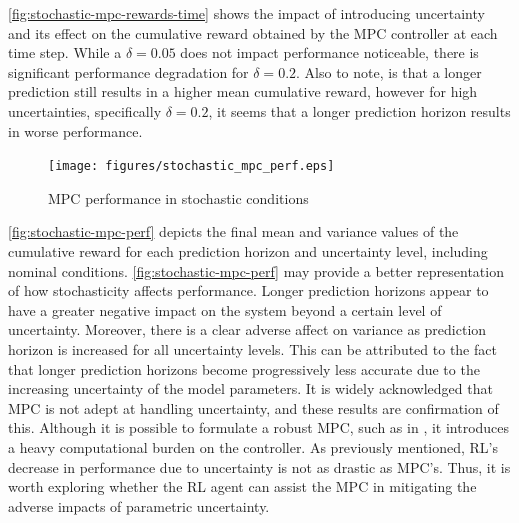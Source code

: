\autoref{fig:stochastic-mpc-rewards-time} shows the impact of introducing uncertainty and its effect on the cumulative reward obtained by the MPC controller at each time step. While a $\delta = 0.05$ does not impact performance noticeable, there is significant performance degradation for $\delta = 0.2$. Also to note, is that a longer prediction still results in a higher mean cumulative reward, however for high uncertainties, specifically $\delta = 0.2$, it seems that a longer prediction horizon results in worse performance.

\begin{figure}[H]
	\centering
	\texttt{[image: figures/stochastic\_mpc\_perf.eps]}
	\caption{MPC performance in stochastic conditions }
	\label{fig:stochastic-mpc-perf}
\end{figure}

\autoref{fig:stochastic-mpc-perf} depicts the final mean and variance values of the cumulative reward for each prediction horizon and uncertainty level, including nominal conditions. \autoref{fig:stochastic-mpc-perf} may provide a better representation of how stochasticity affects performance. Longer prediction horizons appear to have a greater negative impact on the system beyond a certain level of uncertainty. Moreover, there is a clear adverse affect on variance as prediction horizon is increased for all uncertainty levels. This can be attributed to the fact that longer prediction horizons become progressively less accurate due to the increasing uncertainty of the model parameters. It is widely acknowledged that MPC is not adept at handling uncertainty, and these results are confirmation of this. Although it is possible to formulate a robust MPC, such as in \cite{boersmaRobustSamplebasedModel2022}, it introduces a heavy computational burden on the controller. As previously mentioned, RL's decrease in performance due to uncertainty is not as drastic as MPC's. Thus, it is worth exploring whether the RL agent can assist the MPC in mitigating the adverse impacts of parametric uncertainty.


